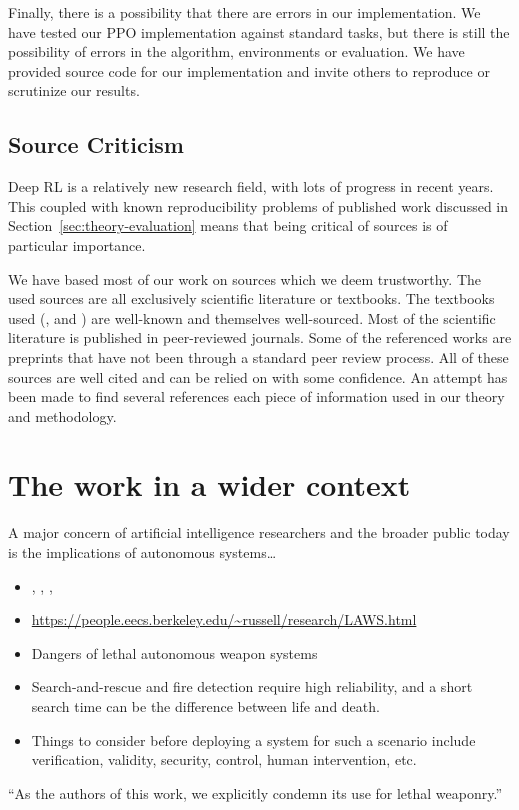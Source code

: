 Finally, there is a possibility that there are errors in our implementation.
We have tested our PPO implementation against standard tasks, but there is still the possibility of errors in the algorithm, environments or evaluation.
We have provided source code for our implementation and invite others to reproduce or scrutinize our results.

\subsection{Source Criticism}

Deep RL is a relatively new research field, with lots of progress in recent years.
This coupled with known reproducibility problems of published work discussed in Section~\ref{sec:theory-evaluation} means that being critical of sources is of particular importance.

We have based most of our work on sources which we deem trustworthy.
The used sources are all exclusively scientific literature or textbooks.
The textbooks used (\cite{russell_artificial_2021}, \cite{sutton_reinforcement_2018} and \cite{goodfellow_deep_2016}) are well-known and themselves well-sourced.
Most of the scientific literature is published in peer-reviewed journals.
Some of the referenced works are preprints that have not been through a standard peer review process.
All of these sources are well cited and can be relied on with some confidence.
An attempt has been made to find several references each piece of information used in our theory and methodology.

\section{The work in a wider context}
\label{sec:discussion-wider}

A major concern of artificial intelligence researchers and the broader public today is the implications of autonomous systems\dots

\begin{itemize}
    \item \cite{russell_research_2015}, \cite{vinuesa_role_2020}, \cite{russell_provably_2022}, \cite{brundage_malicious_2018}
    \item \url{https://people.eecs.berkeley.edu/~russell/research/LAWS.html}
    \item Dangers of lethal autonomous weapon systems
    \item Search-and-rescue and fire detection require high reliability, and a short search time can be the difference between life and death.
    \item Things to consider before deploying a system for such a scenario include verification, validity, security, control, human intervention, etc.
\end{itemize}

``As the authors of this work, we explicitly condemn its use for lethal weaponry.''
